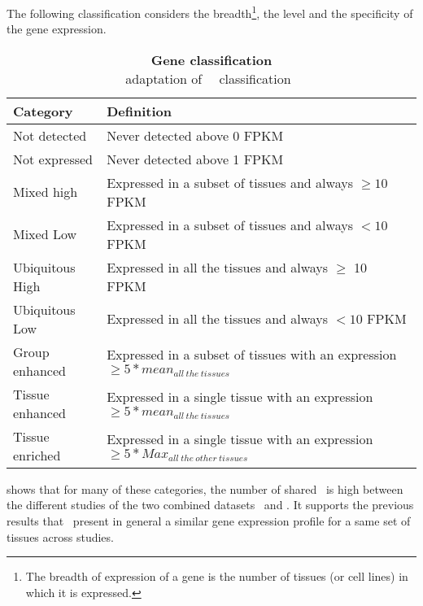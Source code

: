 The following classification considers the breadth\footnote{The breadth
of expression of a gene is the number of tissues (or cell lines)
in which it is expressed.
},
the level and the specificity of the gene expression.

\begin{table}[!htpb]
\centering
\caption[Gene classification]{\textbf{Gene classification}\label{tab:UhlenCat}\\
\footnotesize{adaptation of \uhlen\ \etal\ classification~}}
\begin{tabular}{@{}ll@{}}
\toprule
Category        & Definition                                                                                           \\ \midrule
Not detected    & Never detected above 0 FPKM                                                                    \\
Not expressed   & Never detected above 1 FPKM                                                                    \\
Mixed high      & Expressed in a subset of tissues and always $\geq 10$ FPKM                                     \\
Mixed Low       & Expressed in a subset of tissues and always $< 10$ FPKM                                 \\
Ubiquitous High & Expressed in all the tissues and always $\geq$ 10 FPKM                                         \\
Ubiquitous Low  & Expressed in all the tissues and always $< 10$ FPKM                                     \\
Group enhanced  & Expressed in a subset of tissues with an expression $\geq 5*mean_{all~the~tissues}$             \\
Tissue enhanced & Expressed in a single tissue with an expression $\geq 5*mean_{all~the~tissues}$                 \\
Tissue enriched & Expressed in a single tissue with an expression $\geq 5*Max_{all~the~other~tissues}$ \\ \bottomrule
\end{tabular}
\end{table}

 shows that for many of these categories,
the number of shared \pcgs\ is high between the different studies of the
two combined datasets \setOne\ and \setTwo.
It supports the previous results that \pcgs\ present in general a similar
gene expression profile for a same set of tissues across studies.\mybr\

